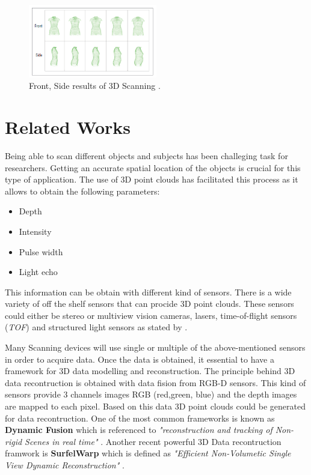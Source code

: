 \documentclass[12pt]{report}
\begin{document}
\begin{figure}[h]
  \begin{center}
  \includegraphics[width=0.5\textwidth]{bodyMedicine.png}
  \caption{Front, Side results of 3D Scanning \cite[]{treleaven_wells_2007}.}
  \label{bodymed}
\end{center}
\end{figure}


\chapter{Related Works}
Being able to scan different objects and subjects has been challeging task for researchers. Getting an accurate spatial location of the objects is crucial for this  type of application.
The use of 3D point clouds has facilitated this process as it allows to obtain the following parameters:
\begin{itemize}[]
  \itemsep0em 
  \item Depth
  \item Intensity
  \item Pulse width
  \item Light echo
\end{itemize}
This information can be obtain with different kind of sensors. There is a wide variety of off the shelf sensors that can procide 3D point clouds. 
These sensors could either be stereo or multiview vision cameras, lasers, time-of-flight sensors (\textit{TOF}) and structured light sensors as stated by .

Many Scanning devices will use single or multiple of the above-mentioned sensors in order to acquire data. Once the data is obtained, it essential to have a framework for 3D data modelling and reconstruction.
The principle behind 3D data recontruction is obtained with data fision from RGB-D sensors. This kind of sensors provide 3 channels images RGB (red,green, blue) and the depth images are mapped to each pixel. Based on this data 3D point clouds could be generated for data recontruction.
One of the most common frameworks is known as \textbf{Dynamic Fusion} which is referenced to \textit{"reconstruction and tracking of Non-rigid Scenes in real time"} .
Another recent powerful 3D Data recontruction framwork is \textbf{SurfelWarp} which is defined as \textit{"Efficient Non-Volumetic Single View Dynamic Reconstruction"} .
\end{document}
